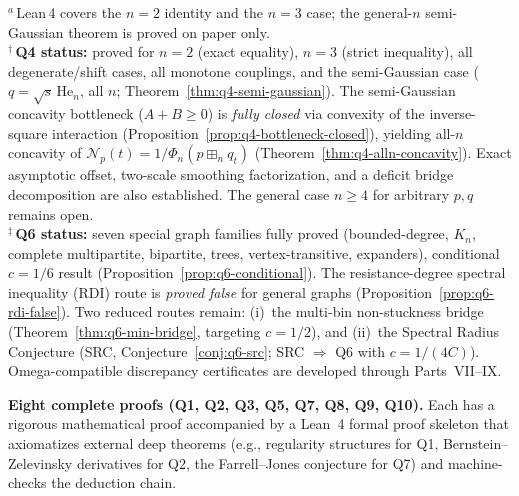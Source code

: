 \documentclass[11pt]{article}
\theoremstyle{definition}
\theoremstyle{remark}
\begin{document}
\begin{table}[h]
\smallskip\noindent
{\footnotesize
${}^a$\,Lean\,4 covers the $n\!=\!2$ identity and the $n\!=\!3$ case;
  the general-$n$ semi-Gaussian theorem is proved on paper only.\\[2pt]
${}^\dagger$\,\textbf{Q4 status:}
  proved for $n=2$ (exact equality), $n=3$ (strict inequality),
  all degenerate/shift cases, all monotone couplings, and the
  semi-Gaussian case ($q=\sqrt{s}\,\mathrm{He}_n$, all $n$;
  Theorem~\ref*{thm:q4-semi-gaussian}).
  The semi-Gaussian concavity bottleneck ($A+B\ge 0$) is
  \emph{fully closed} via convexity of the inverse-square interaction
  (Proposition~\ref*{prop:q4-bottleneck-closed}),
  yielding all-$n$ concavity of $\mathcal N_p(t)=1/\Phi_n(p\boxplus_n q_t)$
  (Theorem~\ref*{thm:q4-alln-concavity}).
  Exact asymptotic offset, two-scale smoothing factorization, and
  a deficit bridge decomposition are also established.
  The general case $n\ge 4$ for arbitrary $p,q$ remains open.\\[2pt]
${}^\ddagger$\,\textbf{Q6 status:}
  seven special graph families fully proved
  (bounded-degree, $K_n$, complete multipartite, bipartite,
  trees, vertex-transitive, expanders),
  conditional $c=1/6$ result
  (Proposition~\ref*{prop:q6-conditional}).
  The resistance-degree spectral inequality (RDI) route is
  \emph{proved false} for general graphs
  (Proposition~\ref*{prop:q6-rdi-false}).
  Two reduced routes remain:
  (i)~the multi-bin non-stuckness bridge
  (Theorem~\ref*{thm:q6-min-bridge}, targeting $c=1/2$), and
  (ii)~the Spectral Radius Conjecture (SRC,
  Conjecture~\ref*{conj:q6-src}; SRC $\Rightarrow$ Q6
  with $c=1/(4C)$).
  Omega-compatible discrepancy certificates are developed
  through Parts~VII--IX.
}
\end{table}

\medskip\noindent
\textbf{Eight complete proofs (Q1, Q2, Q3, Q5, Q7, Q8, Q9, Q10).}
Each has a rigorous mathematical proof accompanied by a Lean~4
formal proof skeleton that axiomatizes external deep theorems
(e.g., regularity structures for Q1, Bernstein--Zelevinsky derivatives
for Q2, the Farrell--Jones conjecture for Q7) and machine-checks
the deduction chain.
\end{document}
